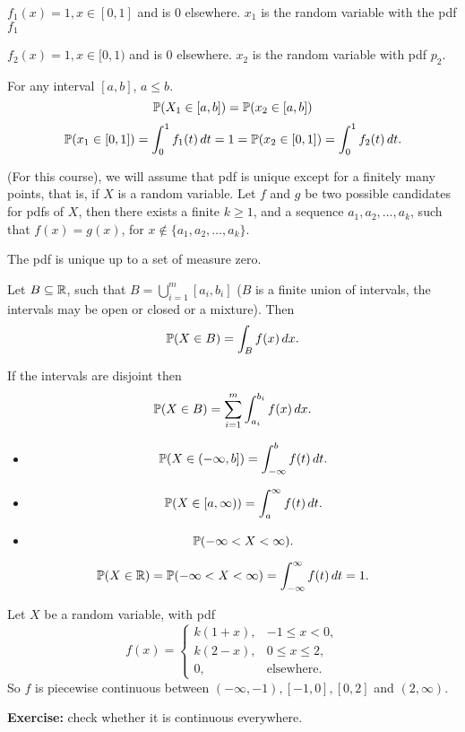 \documentclass[10pt, a4paper]{article}
\begin{document}
\begin{example}
    $f_1(x) = 1, x \in [0, 1]$ and is $0$ elsewhere.
    $x_1$ is the random variable with the pdf $f_1$
    
    $f_2(x) = 1, x \in [0, 1)$ and is $0$ elsewhere.
    $x_2$ is the random variable with pdf $p_2$.

    For any interval $[a, b]$, $a \leq b$.
    \[
    \P(X_1 \in [a, b]) = \P(x_2 \in [a, b])
    \]
    \[
    \P(x_1 \in [0, 1]) = \int_0^1f_1(t)\,dt = 1 = \P(x_2 \in [0, 1]) = \int_0^1f_2(t)\,dt.
    \]

    (For this course),
    we will assume that pdf is unique except for a finitely many points,
    that is,
    if $X$ is a random variable.
    Let $f$ and $g$ be two possible candidates for pdfs of $X$,
    then there exists a finite $k \geq 1$,
    and a sequence $a_1, a_2, \dotsc, a_k$,
    such that $f(x) = g(x)$,
    for $x \notin \{a_1, a_2, \dotsc, a_k\}$.

    The pdf is unique up to a set of measure zero.
\end{example}

\begin{theorem}\label{prob:thm:622}
    Let $B \subseteq \R$,
    such that $\displaystyle B = \bigcup_{i = 1}^{m}[a_i, b_i]$
    ($B$ is a finite union of intervals,
    the intervals may be open or closed or a mixture).
    Then
    \[
    \P(X \in B) = \int_Bf(x)\,dx.
    \]
\end{theorem}

\begin{corollary}
    If the intervals are disjoint then
    \[
    \P(X \in B) = \sum_{i = 1}^{m}\int_{a_i}^{b_i}f(x)\,dx.
    \]
\end{corollary}

\begin{itemize}
    \item 
    \[
    \P(X \in (-\infty, b]) = \int_{-\infty}^bf(t)\,dt.
    \]
    \item 
    \[
    \P(X \in [a, \infty)) = \int_a^{\infty}f(t)\,dt.
    \]
    \item 
    \[
    \P(-\infty < X < \infty).
    \]
\end{itemize}

\begin{corollary}\label{prob:col:623}
    \[
    \P(X \in \R) = \P(-\infty < X < \infty) = \int_{-\infty}^{\infty}f(t)\,dt = 1.
    \]
\end{corollary}

\begin{example}
    Let $X$ be a random variable,
    with pdf
    \[
    f(x) = \begin{cases}
        k(1 + x), & -1 \leq x < 0, \\
        k(2 - x), & 0 \leq x \leq 2, \\
        0, & \text{elsewhere}.
    \end{cases}
    \]
    So $f$ is piecewise continuous between $(-\infty, -1), [-1, 0], [0, 2]$ and $(2, \infty)$.

    \textbf{Exercise: } check whether it is continuous everywhere.
\end{example}
\end{document}
